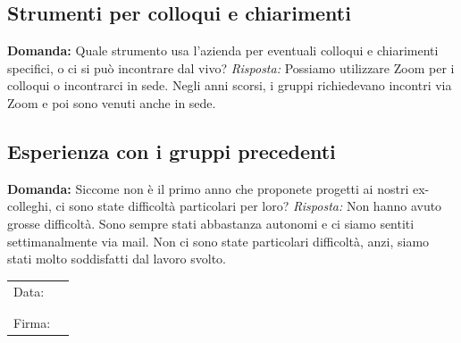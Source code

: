 \documentclass{article}
\begin{document}
\subsection{Strumenti per colloqui e chiarimenti}
\textbf{Domanda:} Quale strumento usa l'azienda per eventuali colloqui e chiarimenti specifici, o ci si può incontrare dal vivo? \newline
\textit{Risposta:} Possiamo utilizzare Zoom per i colloqui o incontrarci in sede. Negli anni scorsi, i gruppi richiedevano incontri via Zoom e poi sono venuti anche in sede.

\subsection{Esperienza con i gruppi precedenti}
\textbf{Domanda:} Siccome non è il primo anno che proponete progetti ai nostri ex-colleghi, ci sono state difficoltà particolari per loro? \newline
\textit{Risposta:} Non hanno avuto grosse difficoltà. Sono sempre stati abbastanza autonomi e ci siamo sentiti settimanalmente via mail. Non ci sono state particolari difficoltà, anzi, siamo stati molto soddisfatti dal lavoro svolto.

\begin{table}[b]
	\begin{tabular}{@{}p{.5in}p{4in}@{}}
		Data:  & \hrulefill \\
			   &     		\\
			   &     		\\
		Firma: & \hrulefill \\
	\end{tabular}
	\end{table}
\end{document}
